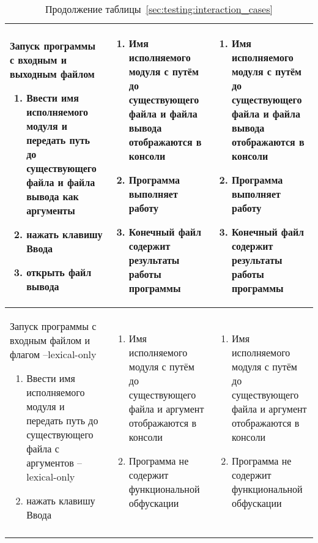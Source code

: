 \begin{longtable}{| >{\centering}p{} | >{\centering}p{} | >{\centering\arraybackslash}p{}|}
   Запуск программы с входным и выходным файлом
   \begin{enumerate}
   \item Ввести имя исполняемого модуля и передать путь до существующего файла и файла вывода как аргументы
   \item нажать клавишу Ввода
   \item открыть файл вывода
   \end{enumerate}
   &
   \begin{enumerate}
   \item Имя исполняемого модуля с путём до существующего файла и файла вывода отображаются в консоли
   \item Программа выполняет работу
   \item Конечный файл содержит результаты работы программы
   \end{enumerate}
   &
   \begin{enumerate}
   \item Имя исполняемого модуля с путём до существующего файла и файла вывода отображаются в консоли
   \item Программа выполняет работу
   \item Конечный файл содержит результаты работы программы
   \end{enumerate} \\
   \hline
   Запуск программы с входным файлом и флагом --lexical-only
   \begin{enumerate}
   \item Ввести имя исполняемого модуля и передать путь до существующего файла с аргументов --lexical-only
   \item нажать клавишу Ввода
   \end{enumerate}
   &
   \begin{enumerate}
   \item Имя исполняемого модуля с путём до существующего файла и аргумент отображаются в консоли
   \item Программа не содержит функциональной обфускации
   \end{enumerate}
   &
   \begin{enumerate}
   \item Имя исполняемого модуля с путём до существующего файла и аргумент отображаются в консоли
   \item Программа не содержит функциональной обфускации
   \end{enumerate} \\
    \pagebreak
   \caption*{Продолжение таблицы~\ref{sec:testing:interaction_cases}} \\

\end{longtable}
